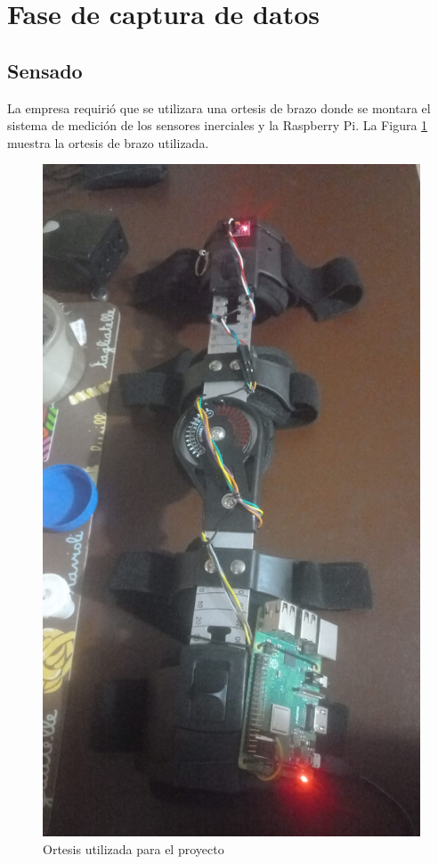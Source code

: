 \documentclass[12pt, twoside]{report}
\begin{document}
\section{Fase de captura de datos}
\subsection{Sensado}

La empresa requirió que se utilizara una ortesis de brazo donde se montara el sistema de medición de los sensores inerciales y la Raspberry Pi. La Figura \ref{fig:ortesis} muestra la ortesis de brazo utilizada.

\begin{figure}[htb]
	\centering
	\includegraphics[scale=0.15]{ortesis.jpg}
	\caption{Ortesis utilizada para el proyecto}
	\label{fig:ortesis}
\end{figure}
\end{document}
